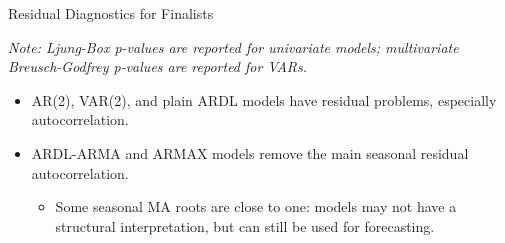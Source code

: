 \documentclass[aspectratio=169,10pt]{beamer}
\newcommand{\smallnote}[1]{%
  \par\vspace{0.05cm}%
  \noindent
  \begin{minipage}{0.96\linewidth}
    \raggedright\scriptsize\itshape #1
  \end{minipage}%
}
\begin{document}
\begin{frame}{Residual Diagnostics for Finalists}
\centering
{}
\smallnote{Note: Ljung-Box p-values are reported for univariate models; multivariate Breusch-Godfrey p-values are reported for VARs.}
\vspace{0.18cm}
\begin{itemize}
    \item AR(2), VAR(2), and plain ARDL models have residual problems, especially autocorrelation.
    \item ARDL-ARMA and ARMAX models remove the main seasonal residual autocorrelation.
    \begin{itemize}
        \item Some seasonal MA roots are close to one: models may not have a structural interpretation, but can still be used for forecasting.
    \end{itemize}
\end{itemize}
\end{frame}
\end{document}
